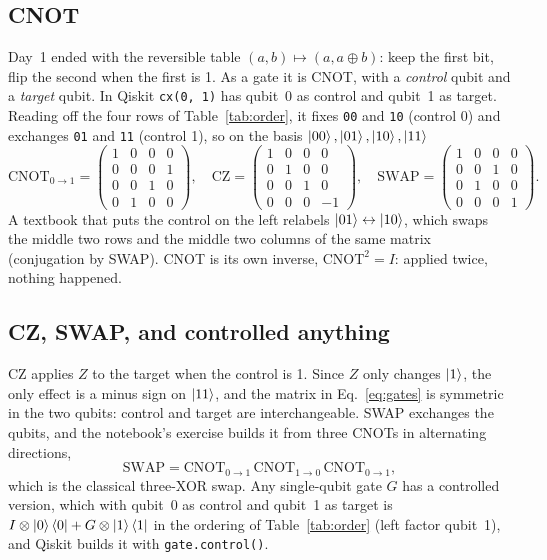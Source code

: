 \documentclass[11pt]{article}
\newcommand{\code}[1]{\texttt{#1}}
\begin{document}
\subsection{CNOT}

Day~1 ended with the reversible table $(a,b)\mapsto(a, a\oplus b)$: keep the first bit, flip the second when the first is 1. As a gate it is \textsc{CNOT}, with a \emph{control} qubit and a \emph{target} qubit. In Qiskit \code{cx(0, 1)} has qubit~0 as control and qubit~1 as target. Reading off the four rows of Table~\ref{tab:order}, it fixes \code{00} and \code{10} (control 0) and exchanges \code{01} and \code{11} (control 1), so on the basis $\ket{00},\ket{01},\ket{10},\ket{11}$
\begin{equation}
\mathrm{CNOT}_{0\to1} = \begin{pmatrix}1&0&0&0\\0&0&0&1\\0&0&1&0\\0&1&0&0\end{pmatrix},
\quad
\mathrm{CZ} = \begin{pmatrix}1&0&0&0\\0&1&0&0\\0&0&1&0\\0&0&0&-1\end{pmatrix},
\quad
\mathrm{SWAP} = \begin{pmatrix}1&0&0&0\\0&0&1&0\\0&1&0&0\\0&0&0&1\end{pmatrix}.
\label{eq:gates}
\end{equation}
A textbook that puts the control on the left relabels $\ket{01} \leftrightarrow \ket{10}$, which swaps the middle two rows and the middle two columns of the same matrix (conjugation by SWAP). CNOT is its own inverse, $\mathrm{CNOT}^2 = I$: applied twice, nothing happened.

\subsection{CZ, SWAP, and controlled anything}

\textsc{CZ} applies $Z$ to the target when the control is 1. Since $Z$ only changes $\ket{1}$, the only effect is a minus sign on $\ket{11}$, and the matrix in Eq.~\eqref{eq:gates} is symmetric in the two qubits: control and target are interchangeable. \textsc{SWAP} exchanges the qubits, and the notebook's exercise builds it from three CNOTs in alternating directions,
\begin{equation}
\mathrm{SWAP} = \mathrm{CNOT}_{0\to1}\,\mathrm{CNOT}_{1\to0}\,\mathrm{CNOT}_{0\to1},
\end{equation}
which is the classical three-XOR swap. Any single-qubit gate $G$ has a controlled version, which with qubit~0 as control and qubit~1 as target is $I\otimes\ket{0}\bra{0} + G\otimes\ket{1}\bra{1}$ in the ordering of Table~\ref{tab:order} (left factor qubit~1), and Qiskit builds it with \code{gate.control()}.
\end{document}
